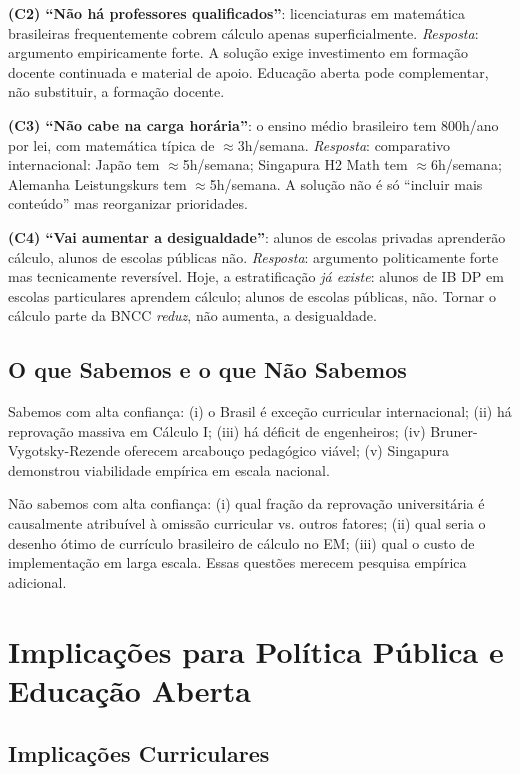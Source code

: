 \documentclass[12pt,a4paper,oneside]{article}
\begin{document}
\textbf{(C2) ``Não há professores qualificados''}: licenciaturas em
matemática brasileiras frequentemente cobrem cálculo apenas
superficialmente. \emph{Resposta}: argumento empiricamente forte. A
solução exige investimento em formação docente continuada e
material de apoio. Educação aberta pode complementar, não
substituir, a formação docente.

\textbf{(C3) ``Não cabe na carga horária''}: o ensino médio
brasileiro tem 800h/ano por lei, com matemática típica de
$\approx$3h/semana. \emph{Resposta}: comparativo internacional:
Japão tem $\approx$5h/semana; Singapura H2 Math tem
$\approx$6h/semana; Alemanha Leistungskurs tem $\approx$5h/semana.
A solução não é só ``incluir mais conteúdo'' mas reorganizar
prioridades.

\textbf{(C4) ``Vai aumentar a desigualdade''}: alunos de escolas
privadas aprenderão cálculo, alunos de escolas públicas não.
\emph{Resposta}: argumento politicamente forte mas tecnicamente
reversível. Hoje, a estratificação \emph{já existe}: alunos de IB
DP em escolas particulares aprendem cálculo; alunos de escolas
públicas, não. Tornar o cálculo parte da BNCC \emph{reduz}, não
aumenta, a desigualdade.

\subsection{O que Sabemos e o que Não Sabemos}

Sabemos com alta confiança: (i) o Brasil é exceção curricular
internacional; (ii) há reprovação massiva em Cálculo I; (iii) há
déficit de engenheiros; (iv) Bruner-Vygotsky-Rezende oferecem
arcabouço pedagógico viável; (v) Singapura demonstrou viabilidade
empírica em escala nacional.

Não sabemos com alta confiança: (i) qual fração da reprovação
universitária é causalmente atribuível à omissão curricular vs.
outros fatores; (ii) qual seria o desenho ótimo de currículo
brasileiro de cálculo no EM; (iii) qual o custo de implementação
em larga escala. Essas questões merecem pesquisa empírica
adicional.

\section{Implicações para Política Pública e Educação Aberta}

\subsection{Implicações Curriculares}
\end{document}
